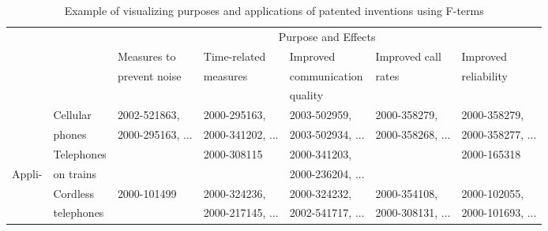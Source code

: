 \documentclass[english]{jnlp_1.2c}
\begin{document}
\begin{table}[t]
\begin{footnotesize}
\begin{center}
\caption{Example of visualizing purposes and applications of patented inventions
using F-terms}
\label{fig:use_fterm}
    \begin{tabular}{|l|l|l|l|l|l|l|} 
\hline
\multicolumn{1}{|l}{} & \multicolumn{1}{l|}{} & \multicolumn{5}{c|}{Purpose and Effects} \\\cline{3-7}
\multicolumn{1}{|l}{} & \multicolumn{1}{l|}{} & Measures to     & Time-related   & Improved             & Improved call         & Improved                      \\
\multicolumn{1}{|l}{} & \multicolumn{1}{l|}{} & prevent noise   & measures               & communication        & rates                         & reliability           \\
\multicolumn{1}{|l}{} & \multicolumn{1}{l|}{} &                                 &                                & quality                      &                                       &                                       \\\hline
\multicolumn{1}{|l|}{}                  & Cellular        & 2002-521863,        & 2000-295163,   & 2003-502959,         & 2000-358279,          & 2000-358279,          \\
\multicolumn{1}{|l|}{}                  & phones          & 2000-295163, ...      & 2000-341202, ... & 2003-502934, ...      & 2000-358268, ...        & 2000-358277, ...        \\\cline{2-7}
\multicolumn{1}{|l|}{}                  & Telephones  &                                 & 2000-308115    & 2000-341203,         &                                       & 2000-165318           \\
\multicolumn{1}{|l|}{Appli-}    & on trains   &                                 &                                & 2000-236204, ...       &                                       &                                       \\\cline{2-7}
\multicolumn{1}{|l|}{}                  & Cordless        & 2000-101499         & 2000-324236,   & 2000-324232,         & 2000-354108,          & 2000-102055,          \\
\multicolumn{1}{|l|}{}                  & telephones  &                                 & 2000-217145, ... & 2002-541717, ...       & 2000-308131, ...        & 2000-101693, ...        \\\cline{2-7}

\end{tabular}
\end{center}
\end{footnotesize}
\end{table}
\end{document}
